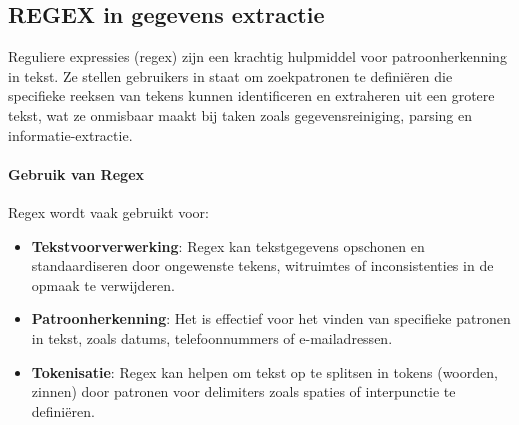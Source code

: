 



\subsection{REGEX in gegevens extractie}

Reguliere expressies (regex) zijn een krachtig hulpmiddel voor patroonherkenning in tekst. Ze stellen gebruikers in staat om zoekpatronen te definiëren die specifieke reeksen van tekens kunnen identificeren en extraheren uit een grotere tekst, wat ze onmisbaar maakt bij taken zoals gegevensreiniging, parsing en informatie-extractie.

\paragraph{Gebruik van Regex}
Regex wordt vaak gebruikt voor:
\begin{itemize}
    \item \textbf{Tekstvoorverwerking}: Regex kan tekstgegevens opschonen en standaardiseren door ongewenste tekens, witruimtes of inconsistenties in de opmaak te verwijderen.
    \item \textbf{Patroonherkenning}: Het is effectief voor het vinden van specifieke patronen in tekst, zoals datums, telefoonnummers of e-mailadressen.
    \item \textbf{Tokenisatie}: Regex kan helpen om tekst op te splitsen in tokens (woorden, zinnen) door patronen voor delimiters zoals spaties of interpunctie te definiëren.
\end{itemize}

